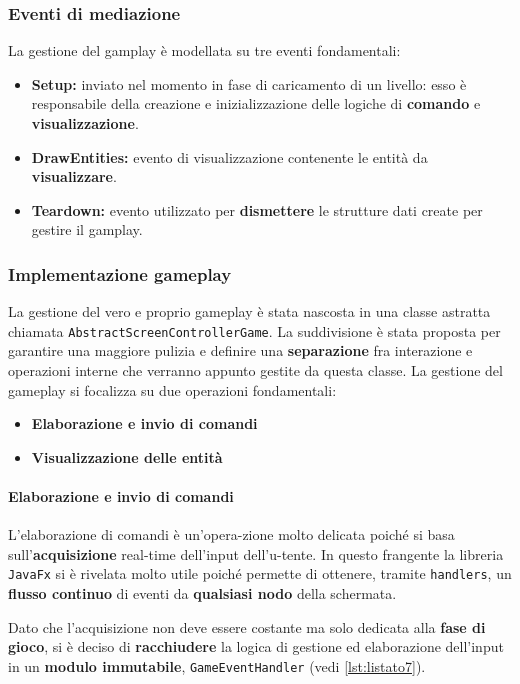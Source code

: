 \subsubsection{Eventi di mediazione}
La gestione del gamplay è modellata su tre eventi fondamentali:
\begin{itemize}
	\item{\textbf{Setup:}} inviato nel momento in fase di caricamento di un livello: esso è responsabile della creazione e inizializzazione delle logiche di \textbf{comando} e \textbf{visualizzazione}.
	\item{\textbf{DrawEntities:}} evento di visualizzazione contenente le entità da \textbf{visualizzare}.
	\item{\textbf{Teardown:}} evento utilizzato per \textbf{dismettere} le strutture dati create per gestire il gamplay.
\end{itemize}

\subsubsection{Implementazione gameplay}
La gestione del vero e proprio gameplay è stata nascosta in una classe astratta chiamata \texttt{AbstractScreenControllerGame}. La suddivisione è stata proposta per garantire una maggiore pulizia e definire una \textbf{separazione} fra interazione e operazioni interne che verranno appunto gestite da questa classe. La gestione del gameplay si focalizza su due operazioni fondamentali:
\begin{itemize}
	\item{\textbf{Elaborazione e invio di comandi}}
	\item{\textbf{Visualizzazione delle entità}}
\end{itemize}

\paragraph{Elaborazione e invio di comandi}
L'elaborazione di comandi è un'opera-zione molto delicata poiché si basa sull'\textbf{acquisizione} real-time dell'input dell'u-tente. In questo frangente la libreria \texttt{JavaFx} si è rivelata molto utile poiché permette di ottenere, tramite \texttt{handlers}, un \textbf{flusso continuo} di eventi da \textbf{qualsiasi nodo} della schermata.

Dato che l'acquisizione non deve essere costante ma solo dedicata alla \textbf{fase di gioco}, si è deciso di \textbf{racchiudere} la logica di gestione ed elaborazione dell'input in un \textbf{modulo immutabile}, \texttt{GameEventHandler} (vedi \ref{lst:listato7}).

